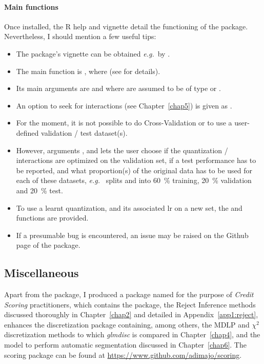 \paragraph{Main functions}

Once installed, the \textsf{R} help and vignette detail the functioning of the package. Nevertheless, I should mention a few useful tips:

\begin{itemize}
\item The package's vignette can be obtained \textit{e.g.}\ by .
\item The main function is , where (see  for details).
\item Its main arguments are  and  where  are assumed to be of type  or .
\item An option to seek for interactions (see Chapter~\ref{chap5}) is given as .
\item For the moment, it is not possible to do Cross-Validation or to use a user-defined validation / test dataset(s).
\item However, arguments ,  and  lets the user choose if the quantization / interactions are optimized on the validation set, if a test performance has to be reported, and what proportion(s) of the original data has to be used for each of these datasets, \textit{e.g.}\  splits  and  into 60~\% training, 20~\% validation and 20~\% test.
\item To use a learnt quantization, and its associated \gls{lr} on a new set, the  and  functions are provided.
\item If a presumable bug is encountered, an issue may be raised on the Github page of the package.
\end{itemize}

\subsection{Miscellaneous}

Apart from the  package, I produced a package named  for the purpose of \textit{Credit Scoring} practitioners, which contains the  package, the Reject Inference methods discussed thoroughly in Chapter~\ref{chap2} and detailed in Appendix~\ref{app1:reject}, enhances the discretization package containing, among others, the MDLP and $\chi^2$ discretization methods to which \textit{glmdisc} is compared in Chapter~\ref{chap4}, and the model to perform automatic segmentation discussed in Chapter~\ref{chap6}. The scoring package can be found at \url{https://www.github.com/adimajo/scoring}.

